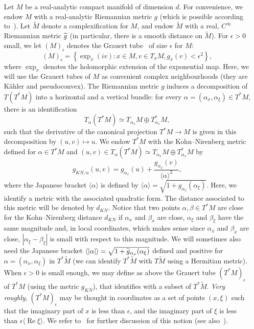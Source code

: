 \documentclass[10pt]{amsart}
\theoremstyle{definition}\newtheorem{defi}[theo]{Definition}\newtheorem{rema}[theo]{Remark}\newtheorem{exam}[theo]{Example}\newtheorem{exem}[theo]{Example}\newtheorem{nota}[theo]{Notation}
\DeclareMathOperator{\re}{Re}
\newcommand{\set}[1]{\left\{ #1 \right\}}
\newcommand{\va}[1]{\left|#1\right|}
\newcommand{\brac}[1]{\langle #1 \rangle}
\let\oldtilde\tilde
\renewcommand*{\tilde}[1]{\mathchoice{\widetilde{#1}}{\widetilde{#1}}{\oldtilde{#1}}{\oldtilde{#1}}}
\begin{document}
Let $M$ be a real-analytic compact manifold of dimension $d$. For convenience, we endow $M$ with a real-analytic Riemannian metric $g$ (which is possible according to~\cite{morrey_embedding}). Let $\widetilde{M}$ denote a complexification for $M$, and endow $\widetilde{M}$ with a real, $C^\infty$ Riemannian metric $\tilde{g}$ (in particular, there is a smooth distance on $\widetilde{M}$). For $\epsilon > 0$ small, we let $(M)_\epsilon$ denotes the Grauert tube~\cite{grauert_tube_I,grauert_tube_II} of size $\epsilon$ for $M$:
\begin{equation*}
(M)_\epsilon = \set{\exp_x(iv) : x \in M, v \in T_x M, g_x(v) < \epsilon^2},
\end{equation*}
where $\exp_x$ denotes the holomorphic extension of the exponential map. Here, we will use the Grauert tubes of $M$ as convenient complex neighbourhoods (they are Kähler and pseudoconvex). The Riemannian metric $g$ induces a decomposition of $T(T^* M)$ into a horizontal and a vertical bundle: for every $\alpha = (\alpha_x,\alpha_\xi) \in T^* M$, there is an identification
\begin{equation*}
T_\alpha(T^* M) \simeq T_{\alpha_x} M \oplus T_{\alpha_x}^* M,
\end{equation*}
such that the derivative of the canonical projection $T^* M \to M$ is given in this decomposition by $(u,v) \mapsto u$. We endow $T^* M$ with the Kohn--Nirenberg metric defined for $\alpha \in T^* M$ and $(u,v) \in T_\alpha(T^* M) \simeq T_{\alpha_x} M \oplus T_{\alpha_x}^* M$ by
\begin{equation*}
g_{KN,\alpha}(u,v) = g_{\alpha_x}(u) + \frac{g_{\alpha_x}(v)}{\brac{\alpha}^2},
\end{equation*}
where the Japanese bracket $\brac{\alpha}$ is defined by $\brac{\alpha} = \sqrt{1 + g_{\alpha_x}(\alpha_\xi)}$. Here, we identify a metric with the associated quadratic form. The distance associated to this metric will be denoted by $d_{KN}$. Notice that two points $\alpha,\beta \in T^* M$ are close for the Kohn--Nirenberg distance $d_{KN}$ if $\alpha_x$ and $\beta_x$ are close, $\alpha_\xi$ and $\beta_\xi$ have the same magnitude and, in local coordinates, which makes sense since $\alpha_x$ and $\beta_x$ are close, $|\alpha_\xi - \beta_\xi|$ is small with respect to this magnitude. We will sometimes also need the Japanese bracket $\brac{\va{\alpha}} = \sqrt{1 + \tilde{g}_{\alpha_x}(\alpha_\xi)}$ defined and positive for $\alpha= (\alpha_x,\alpha_\xi)$ in $T^* \widetilde{M}$ (we can identify $T^* \widetilde{M}$ with $T \widetilde{M}$ using a Hermitian metric). When $\epsilon > 0$ is small enough, we may define as above the Grauert tube $(T^* M)_\epsilon$ of $T^* M$ (using the metric $g_{KN}$), that identifies with a subset of $T^* \widetilde{M}$. \emph{Very roughly}, $(T^* M)_{\epsilon}$ may be thought in coordinates as a set of points $(x,\xi)$ such that the imaginary part of $x$ is less than $\epsilon$, and the imaginary part of $\xi$ is less than $\epsilon \brac{\re \xi}$. We refer to~\cite[\S~1.1.1.2]{BJ20} for further discussion of this notion (see also~\cite[\S~5.1]{upper_bound_resonances}).
\end{document}
